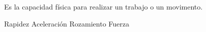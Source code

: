 
\question Es la capacidad física para realizar un trabajo o un movimento.

  \begin{oneparchoices}
    \choice Rapidez
    \choice Aceleración
    \choice Rozamiento
    \CorrectChoice Fuerza
  \end{oneparchoices}
  \answerline[D]
